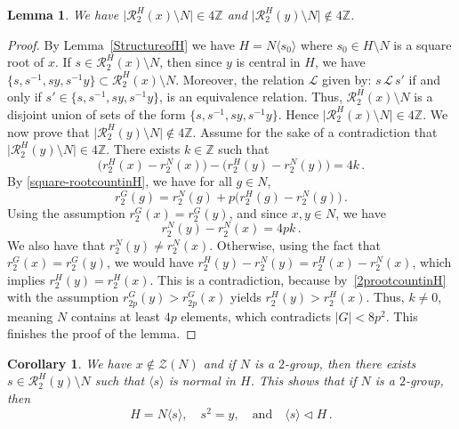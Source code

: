 \documentclass[12pt]{amsart}
\numberwithin{equation}{section}
\newcommand{\Ord}{{\rm Ord}}
\newcommand{\Z}{\mathbb Z}
\newtheorem{cor}[X]{Corollary}
\newtheorem{lem}[X]{Lemma}
\theoremstyle{definition}
\theoremstyle{remark}
\begin{document}
\begin{lem}\label{divisibilityby4}
    We have  $\bigl| \mathcal{R}_2^H(x) \setminus N\bigr|\in 4\Z$ and $\bigl| \mathcal{R}_2^H(y) \setminus N\bigr|\notin4\Z$. 
\end{lem}
\begin{proof}
    By Lemma~\ref{StructureofH} we have $H=N\langle s_0\rangle$ where $s_0\in H\setminus N$ is a square root of $x$. %
    If $s\in \mathcal{R}_2^H(x)\setminus N$, then since $y$ is central in $H$, we have $\{ s, s^{-1}, sy, s^{-1}y\}\subset  \mathcal{R}_2^H(x)\setminus N $. Moreover, the relation $\mathcal{L}$ given by: $s\, \mathcal{L}\, s'$ if and only if $s'\in \{ s, s^{-1}, sy, s^{-1}y\}$, is an equivalence relation. Thus, $\mathcal{R}_2^H(x)\setminus N$ is a disjoint union of sets of the form $\{s,s^{-1},sy,s^{-1}y\}$. Hence $\bigl| \mathcal{R}_2^H(x) \setminus N\bigr|\in 4\Z$. 
    We now prove that $\bigl| \mathcal{R}_2^H(y) \setminus N\bigr|\notin4\Z$. Assume for the sake of a contradiction that $\bigl| \mathcal{R}_2^H(y) \setminus N\bigr|\in4\Z$. There exists $k\in \Z$ such that \[ \bigl(r_2^H(x)-r_2^N(x)\bigr)-\bigl(r_2^H(y)-r_2^N(y)\bigr)=4k\, .\]
    By \eqref{square-rootcountinH}, we have for all $g\in N$, \[r_2^G(g)=r_2^N(g)+p \bigl(r_2^H(g)-r_2^N(g)\bigr)\, .\]
    Using the assumption $r_2^G(x)=r_2^G(y)$, and since $x,y\in N$, we have \[r_2^N(y)-r_2^N(x)=4pk\, .\]
    We also have that $r_2^N(y)\ne r_2^N(x)$. Otherwise, using the fact that $r_2^G(x)=r_2^G(y)$, we would have $r_2^H(y)-r_2^N(y)=r_2^H(x)-r_2^N(x)$, which implies $r_2^H(y)=r_2^H(x)$. This is a contradiction, because by~\eqref{2prootcountinH} with the assumption $r_{2p}^G(y)>r_{2p}^G(x)$ yields $r_2^H(y)> r_2^H(x)$. Thus, $k\ne 0$, meaning $N$ contains at least $4p$ elements, which contradicts $|G|<8p^2$. This finishes the proof of the lemma.
\end{proof}
\begin{cor}\label{finalstructureofH}
    We have $x\notin \mathcal{Z}(N)$ and if $N$ is a $2$-group, then there exists $s\in \mathcal{R}_2^H(y)\setminus N$ such that $\langle s\rangle $ is normal in $H$. This shows that if $N$ is a $2$-group, then \[ H= N\langle s \rangle,\quad s^2=y,\quad\text{and}\quad \langle s\rangle \lhd H\, . \]
\end{cor}
\end{document}
